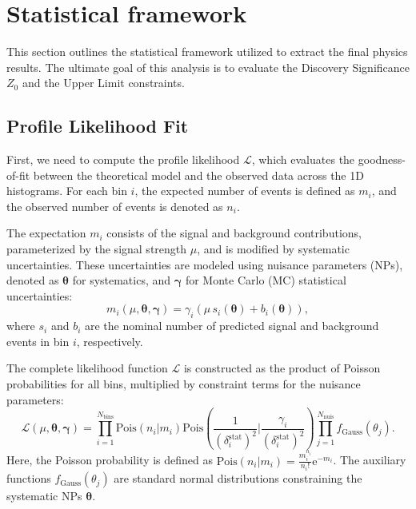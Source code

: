 \documentclass[12pt]{article}
\newcommand*{\euler}{\mathrm{e}}
\begin{document}






\section{Statistical framework}%
\label{sec:statistical_framework}

    This section outlines the statistical framework utilized to extract the final physics results. The ultimate goal of this analysis is to evaluate the Discovery Significance $Z_0$ and the Upper Limit constraints.

    \subsection{Profile Likelihood Fit}%
    \label{sub:profile_likelihood_fit}
        
        First, we need to compute the profile likelihood $\mathcal{L}$, which evaluates the goodness-of-fit between the theoretical model and the observed data across the 1D histograms. For each bin $i$, the expected number of events is defined as $m_i$, and the observed number of events is denoted as $n_i$.

        The expectation $m_i$ consists of the signal and background contributions, parameterized by the signal strength $\mu$, and is modified by systematic uncertainties. These uncertainties are modeled using nuisance parameters (NPs), denoted as $\boldsymbol{\theta}$ for systematics, and $\boldsymbol{\gamma}$ for Monte Carlo (MC) statistical uncertainties:
        \begin{equation}
            m_i( \mu, \boldsymbol{\theta}, \boldsymbol{\gamma} ) = \gamma_i \left( \mu \, s_i(\boldsymbol{\theta}) + b_i(\boldsymbol{\theta}) \right),
        \end{equation}
        where $s_i$ and $b_i$ are the nominal number of predicted signal and background events in bin $i$, respectively.

        The complete likelihood function $\mathcal{L}$ is constructed as the product of Poisson probabilities for all bins, multiplied by constraint terms for the nuisance parameters:
        \begin{equation}
            \mathcal{L}(\mu, \boldsymbol{\theta}, \boldsymbol{\gamma}) = \prod_{i=1}^{N_{\text{bins}}} \text{Pois}\left( n_i | m_i \right) \mathrm{Pois}\left(\frac{1}{(\delta_i^{\text{stat}})^2} \Bigg| \frac{\gamma_i}{(\delta_i^{\text{stat}})^2} \right) \prod_{j=1}^{N_{\text{nuis}}} f_{\text{Gauss}}(\theta_j).
        \end{equation}
        Here, the Poisson probability is defined as $\mathrm{Pois}(n_i | m_i) = \frac{m_i^{n_i}}{n_i!} \euler^{-m_i}$. The auxiliary functions $f_{\text{Gauss}}(\theta_j)$ are standard normal distributions constraining the systematic NPs $\boldsymbol{\theta}$.
\end{document}
